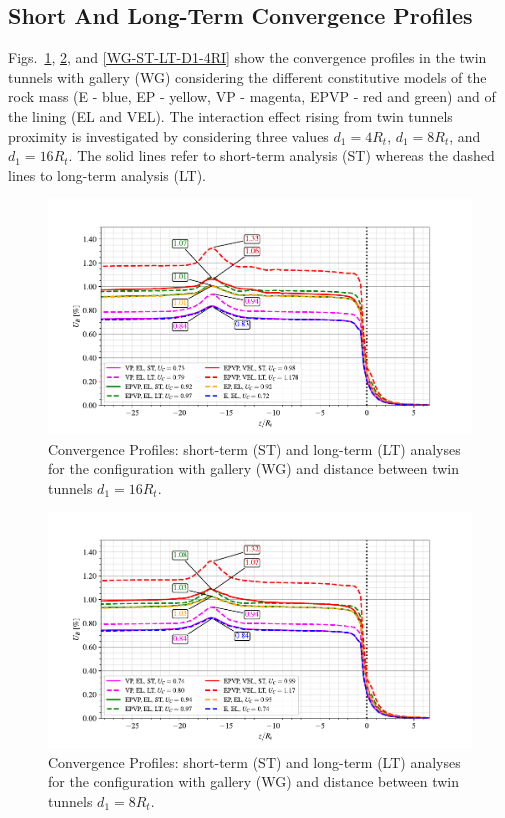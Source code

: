 \documentclass[Journal,letterpaper, NoLists,SectionNumbers]{ascelike-new}
\begin{document}
\subsection{Short And Long-Term Convergence Profiles}\label{sec72}

Figs.~\ref{WG-ST-LT-D1-16RI}, \ref{WG-ST-LT-D1-8RI}, and \ref{WG-ST-LT-D1-4RI} show the convergence profiles in the twin tunnels with gallery (WG) considering the different constitutive models of the rock mass (E - blue, EP - yellow, VP - magenta, EPVP - red and green) and of the lining (EL and VEL). The interaction effect rising from twin tunnels proximity is investigated by considering three values $d_1=4R_t$, $d_1=8R_t$, and $d_1=16R_t$.  The solid lines refer to short-term analysis (ST) whereas the dashed lines to long-term analysis (LT).

\begin{figure}[h!]
	\centering
	\includegraphics[scale=0.9]{Convergence Profiles - WG_ST_LT - $d_1=16R_i$_anotate.pdf}
	\caption{Convergence Profiles: short-term (ST) and long-term (LT) analyses for the configuration with gallery (WG) and distance between twin tunnels $d_1 = 16R_t$.}
	\label{WG-ST-LT-D1-16RI}
\end{figure}

\begin{figure}[h!]
	\centering
	\includegraphics[scale=0.9]{Convergence Profiles - WG_ST_LT - $d_1=8R_i$_anotate.pdf}
	\caption{
		Convergence Profiles: short-term (ST) and long-term (LT) analyses for the configuration with gallery (WG) and distance between twin tunnels $d_1 = 8R_t$.}
	\label{WG-ST-LT-D1-8RI}
\end{figure}
\end{document}
